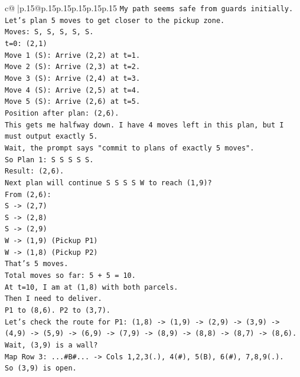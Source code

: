 \documentclass{article}
\begin{document}
{\begin{supertabular}{c@{$\;$}|p{.15\linewidth}@{}p{.15\linewidth}p{.15\linewidth}p{.15\linewidth}p{.15\linewidth}p{.15\linewidth}}
{{{\texttt{My path seems safe from guards initially.} \\
\texttt{Let's plan 5 moves to get closer to the pickup zone.} \\
\texttt{Moves: S, S, S, S, S.} \\
\texttt{t=0: (2,1)} \\
\texttt{Move 1 (S): Arrive (2,2) at t=1.} \\
\texttt{Move 2 (S): Arrive (2,3) at t=2.} \\
\texttt{Move 3 (S): Arrive (2,4) at t=3.} \\
\texttt{Move 4 (S): Arrive (2,5) at t=4.} \\
\texttt{Move 5 (S): Arrive (2,6) at t=5.} \\
\texttt{Position after plan: (2,6).} \\
\texttt{This gets me halfway down. I have 4 moves left in this plan, but I must output exactly 5.} \\
\texttt{Wait, the prompt says "commit to plans of exactly 5 moves".} \\
\texttt{So Plan 1: S S S S S.} \\
\texttt{Result: (2,6).} \\
\texttt{Next plan will continue S S S S W to reach (1,9)?} \\
\texttt{From (2,6):} \\
\texttt{S {-}> (2,7)} \\
\texttt{S {-}> (2,8)} \\
\texttt{S {-}> (2,9)} \\
\texttt{W {-}> (1,9) (Pickup P1)} \\
\texttt{W {-}> (1,8) (Pickup P2)} \\
\texttt{That's 5 moves.} \\
\texttt{Total moves so far: 5 + 5 = 10.} \\
\texttt{At t=10, I am at (1,8) with both parcels.} \\
\texttt{Then I need to deliver.} \\
\texttt{P1 to (8,6). P2 to (3,7).} \\
\texttt{Let's check the route for P1: (1,8) {-}> (1,9) {-}> (2,9) {-}> (3,9) {-}> (4,9) {-}> (5,9) {-}> (6,9) {-}> (7,9) {-}> (8,9) {-}> (8,8) {-}> (8,7) {-}> (8,6).} \\
\texttt{Wait, (3,9) is a wall?} \\
\texttt{Map Row 3: ...\#B\#... {-}> Cols 1,2,3(.), 4(\#), 5(B), 6(\#), 7,8,9(.).} \\
\texttt{So (3,9) is open.} \\
}}}
\end{supertabular}}
\end{document}
